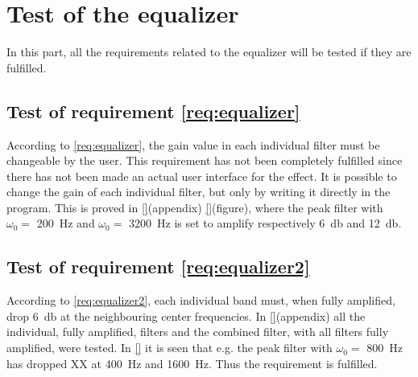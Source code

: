 \section{Test of the equalizer}
In this part, all the requirements related to the equalizer will be tested if they are fulfilled. 


\subsection{Test of requirement \autoref{req:equalizer}}
According to \autoref{req:equalizer}, the gain value in each individual filter must be changeable by the user. This requirement has not been completely fulfilled since there has not been made an actual user interface for the effect. It is possible to change the gain of each individual filter, but only by writing it directly in the program. This is proved in \autoref{}(appendix) \autoref{}(figure), where the peak filter with $\omega_0 =$ \SI{200}{\hertz} and $\omega_0 =$ \SI{3200}{\hertz} is set to amplify respectively \SI{6}{\decibel} and \SI{12}{\decibel}. 




\subsection{Test of requirement \autoref{req:equalizer2}}
According to \autoref{req:equalizer2}, each individual band must, when fully amplified, drop \SI{6}{\decibel} at the neighbouring center frequencies. In \autoref{}(appendix) all the individual, fully amplified, filters and the combined filter, with all filters fully amplified, were tested. In \autoref{}  it is seen that e.g. the peak filter with $\omega_0 =$ \SI{800}{\hertz} has dropped XX at \SI{400}{\hertz} and \SI{1600}{\hertz}. Thus the requirement is fulfilled. 

